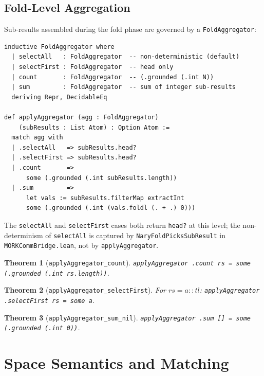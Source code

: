 \documentclass[11pt]{article}
\newtheorem{theorem}{Theorem}[section]
\theoremstyle{definition}
\theoremstyle{remark}
\begin{document}
\subsection{Fold-Level Aggregation}

Sub-results assembled during the fold phase are governed by a
\texttt{FoldAggregator}:

\begin{lstlisting}[caption={Fold aggregator (\texttt{Syntax.lean}).}]
inductive FoldAggregator where
  | selectAll   : FoldAggregator  -- non-deterministic (default)
  | selectFirst : FoldAggregator  -- head only
  | count       : FoldAggregator  -- (.grounded (.int N))
  | sum         : FoldAggregator  -- sum of integer sub-results
  deriving Repr, DecidableEq

def applyAggregator (agg : FoldAggregator)
    (subResults : List Atom) : Option Atom :=
  match agg with
  | .selectAll   => subResults.head?
  | .selectFirst => subResults.head?
  | .count       =>
      some (.grounded (.int subResults.length))
  | .sum         =>
      let vals := subResults.filterMap extractInt
      some (.grounded (.int (vals.foldl (. + .) 0)))
\end{lstlisting}

\noindent
The \texttt{selectAll} and \texttt{selectFirst} cases both return
\texttt{head?} at this level; the non-determinism of \texttt{selectAll} is
captured by \texttt{NaryFoldPicksSubResult} in \texttt{MORKCommBridge.lean},
not by \texttt{applyAggregator}.

\begin{theorem}[\texttt{applyAggregator\_count}]
\texttt{applyAggregator .count rs = some (.grounded (.int rs.length))}.
\end{theorem}

\begin{theorem}[\texttt{applyAggregator\_selectFirst}]
For $\mathit{rs} = a :: \mathit{tl}$:
\texttt{applyAggregator .selectFirst rs = some a}.
\end{theorem}

\begin{theorem}[\texttt{applyAggregator\_sum\_nil}]
\texttt{applyAggregator .sum [] = some (.grounded (.int 0))}.
\end{theorem}

\section{Space Semantics and Matching}
\label{sec:space}
\end{document}
